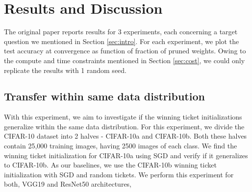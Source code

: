 \documentclass{article}
\begin{document}
\section{Results and Discussion}
\label{sec:results}
The original paper reports results for 3 experiments, each concerning a target question we mentioned in Section \ref{sec:intro}. For each experiment, we plot the test accuracy at convergence as function of fraction of pruned weights. Owing to the compute and time constraints mentioned in Section \ref{sec:cost}, we could only replicate the results with 1 random seed. 

\subsection{Transfer within same data distribution}
With this experiment, we aim to investigate if the winning ticket initializations generalize within the same data distribution. For this experiment, we divide the CIFAR-10 dataset into 2 halves - CIFAR-10a and CIFAR-10b. Both these halves contain 25,000 training images, having 2500 images of each class. We find the winning ticket initialization for CIFAR-10a using SGD and verify if it generalizes to CIFAR-10b. As our baselines, we use the CIFAR-10b winning ticket initialization with SGD and random tickets. We perform this experiment for both, VGG19 and ResNet50 architectures,
\end{document}
